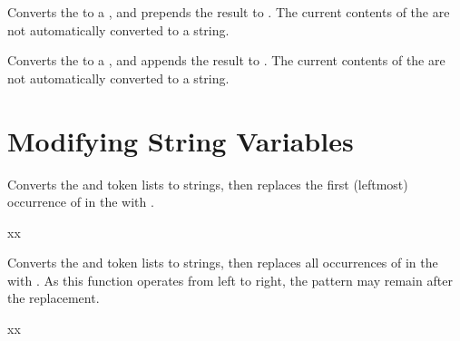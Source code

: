 \documentclass[oneside]{book}
\begin{document}
\begin{function}{\StrPutLeft}
\begin{syntax}
  
\end{syntax}
Converts the  to a , and prepends the
result to .  The current contents of the  are not automatically converted to a string.
\begin{demohigh}
\StrSet {}
\StrPutLeft {}
\StrUse \lTmpkStr
\end{demohigh}
\end{function}

\begin{function}{\StrPutRight}
\begin{syntax}
  
\end{syntax}
Converts the  to a , and appends the
result to .  The current contents of the  are not automatically converted to a string.
\begin{demohigh}
\StrSet {}
\StrPutRight {}
\StrUse \lTmpkStr
\end{demohigh}
\end{function}

\section{Modifying String Variables}

\begin{function}{\StrVarReplaceOnce}
\begin{syntax}
   
\end{syntax}
Converts the  and  token lists to strings, then
replaces the first (leftmost) occurrence of  in the
 with .
\begin{demohigh}
\StrSet {}
\StrVarReplaceOnce {} {xx}
\StrUse \lTmpaStr
\end{demohigh}
\end{function}

\begin{function}{\StrVarReplaceAll}
\begin{syntax}
   
\end{syntax}
Converts the  and  token lists to strings, then
replaces all occurrences of  in the
 with .
As this function
operates from left to right, the pattern 
may remain after the replacement.
\begin{demohigh}
\StrSet {}
\StrVarReplaceAll {} {xx}
\StrUse \lTmpaStr
\end{demohigh}
\end{function}
\end{document}
